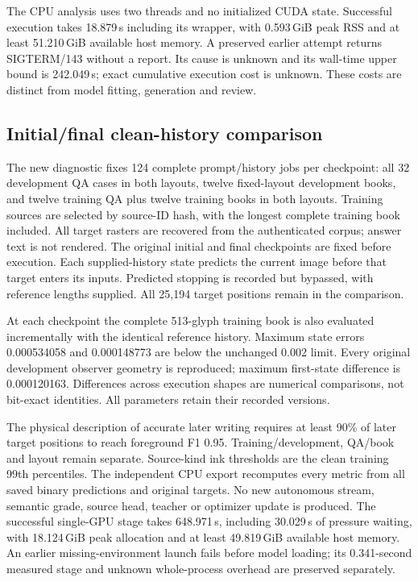 The CPU analysis uses two threads and no initialized CUDA state. Successful
execution takes 18.879\,s including its wrapper, with 0.593\,GiB peak RSS and
at least 51.210\,GiB available host memory. A preserved earlier attempt returns
SIGTERM/143 without a report. Its cause is unknown and its wall-time upper
bound is 242.049\,s; exact cumulative execution cost is unknown. These costs
are distinct from model fitting, generation and review.

\subsection*{Initial/final clean-history comparison}
The new diagnostic fixes 124 complete prompt/history jobs per checkpoint:
all 32 development QA cases in both layouts, twelve fixed-layout development
books, and twelve training QA plus twelve training books in both layouts.
Training sources are selected by source-ID hash, with the longest complete
training book included. All target rasters are recovered from the authenticated
corpus; answer text is not rendered. The original initial and final checkpoints
are fixed before execution. Each supplied-history state predicts the current
image before that target enters its inputs. Predicted stopping is recorded but
bypassed, with reference lengths supplied. All 25,194 target positions remain
in the comparison.

At each checkpoint the complete 513-glyph training book is also evaluated
incrementally with the identical reference history. Maximum state errors
0.000534058 and 0.000148773 are below the unchanged 0.002 limit. Every original
development observer geometry is reproduced; maximum first-state difference
is 0.000120163. Differences across execution shapes are numerical comparisons,
not bit-exact identities. All parameters retain their recorded versions.

The physical description of accurate later writing requires at least 90\% of
later target positions to reach foreground F1 0.95. Training/development,
QA/book and layout remain separate. Source-kind ink thresholds are the clean
training 99th percentiles. The independent CPU export recomputes every metric
from all saved binary predictions and original targets. No new autonomous
stream, semantic grade, source head, teacher or optimizer update is produced.
The successful single-GPU stage takes 648.971\,s, including 30.029\,s of
pressure waiting, with 18.124\,GiB peak allocation and at least 49.819\,GiB
available host memory. An earlier missing-environment launch fails before
model loading; its 0.341-second measured stage and unknown whole-process
overhead are preserved separately.
